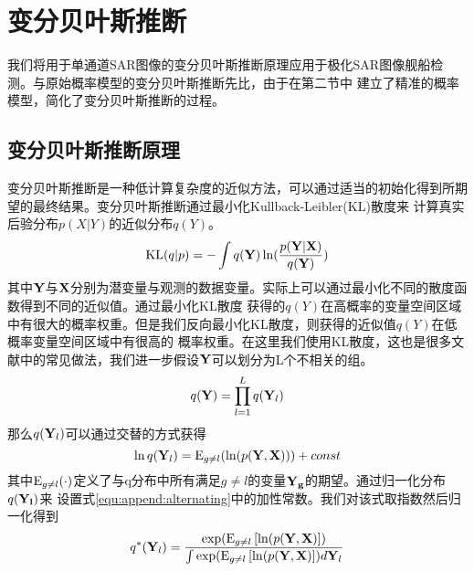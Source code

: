 \section{变分贝叶斯推断}
我们将用于单通道SAR图像的变分贝叶斯推断原理应用于极化SAR图像舰船检测。与原始概率模型的变分贝叶斯推断先比，由于在第二节中
建立了精准的概率模型，简化了变分贝叶斯推断的过程。
\subsection{变分贝叶斯推断原理}
变分贝叶斯推断是一种低计算复杂度的近似方法，可以通过适当的初始化得到所期望的最终结果。变分贝叶斯推断通过最小化Kullback-Leibler(KL)散度来
计算真实后验分布$p(X|Y)$的近似分布$q(Y)$。
\begin{equation}
    \label{equ:append:KL}
    {\rm{KL}}(q|p) =  - \int {q({\bf{Y}})\ln (\frac{{p({\bf{Y}}|{\bf{X}})}}{{q({\bf{Y}})}})}
\end{equation}
其中${\bf{Y}}$与${\bf{X}}$分别为潜变量与观测的数据变量。实际上可以通过最小化不同的散度函数得到不同的近似值。通过最小化KL散度
获得的$q(Y)$在高概率的变量空间区域中有很大的概率权重。但是我们反向最小化KL散度，则获得的近似值$q(Y)$在低概率变量空间区域中有很高的
概率权重。在这里我们使用KL散度，这也是很多文献中的常见做法，我们进一步假设$\bf{Y}$可以划分为L个不相关的组。
\begin{equation}
    \label{equ:append:partition}
    q({\bf{Y}}) = \prod\limits_{l = 1}^L {q({{\bf{Y}}_l})} 
\end{equation}
那么$ {q({{\bf{Y}}_l})}$可以通过交替的方式获得
\begin{equation}
    \label{equ:append:alternating}
    \ln q({{\bf{Y}}_l}) = {{\rm E}_{g \ne l}}(\ln (p({\bf{Y}},{\bf{X}}))) + const
\end{equation}
其中${{\rm E}_{g \ne l}}(\cdot)$定义了与q分布中所有满足${g \ne l}$的变量$\bf{Y}_g$的期望。通过归一化分布$q(\bf{Y}_l)$来
设置式\ref{equ:append:alternating}中的加性常数。我们对该式取指数然后归一化得到
\begin{equation}
    \label{equ:append:normalize}
    {q^*}({{\bf{Y}}_l}) = \frac{{\exp ({{\rm E}_{g \ne l}}\left[ {\ln (p({\bf{Y}},{\bf{X}})} \right])}}{{\int {\exp ({{\rm E}_{g \ne l}}\left[ {\ln (p({\bf{Y}},{\bf{X}})} \right])d{{\bf{Y}}_l}} }}
\end{equation}
